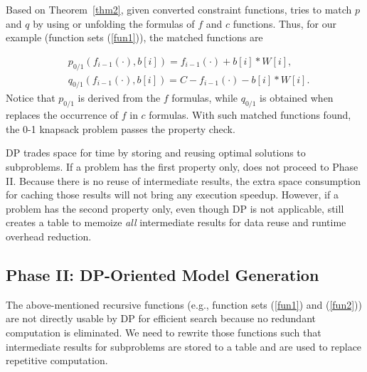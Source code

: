Based on Theorem~\ref{thm2}, given converted constraint functions, \tool tries to match $p$ and $q$ by using or unfolding the formulas of 
 $f$ and $c$ functions. Thus, for our example (function sets (\ref{fun1})), the matched functions are

\begin{align}
    & p_{0/1}(f_{i-1}(\cdot), b[i])=f_{i-1}(\cdot)+b[i]*W[i], \nonumber\\
    & q_{0/1}(f_{i-1}(\cdot), b[i])=C-f_{i-1}(\cdot)-b[i]*W[i]. \nonumber
\end{align}
Notice that $p_{0/1}$ is derived from the $f$ formulas, while $q_{0/1}$ is obtained when \tool replaces the occurrence of $f$ in $c$ formulas. 
 With such matched functions found, the 0-1 knapsack problem passes the property check. 
 
DP trades space for time by storing and reusing optimal solutions to subproblems. 
If a problem has the first property only, \tool does not proceed to Phase II. Because there is no reuse of intermediate results, the extra space consumption for caching those results will not bring any execution speedup. 
However, if a problem has the second property only, even though DP is not applicable, \tool still creates a table to memoize \emph{all} intermediate results  for data reuse and runtime overhead reduction. 

  
 
 
 \subsection{Phase II: DP-Oriented Model Generation}
 \label{sec:generate}
 
The above-mentioned recursive functions (e.g., function sets (\ref{fun1}) and (\ref{fun2})) are not directly usable by DP for efficient search because no redundant computation is eliminated. 
We need to rewrite those functions 
such that intermediate results for subproblems are stored to a table and are used to replace repetitive computation. 


